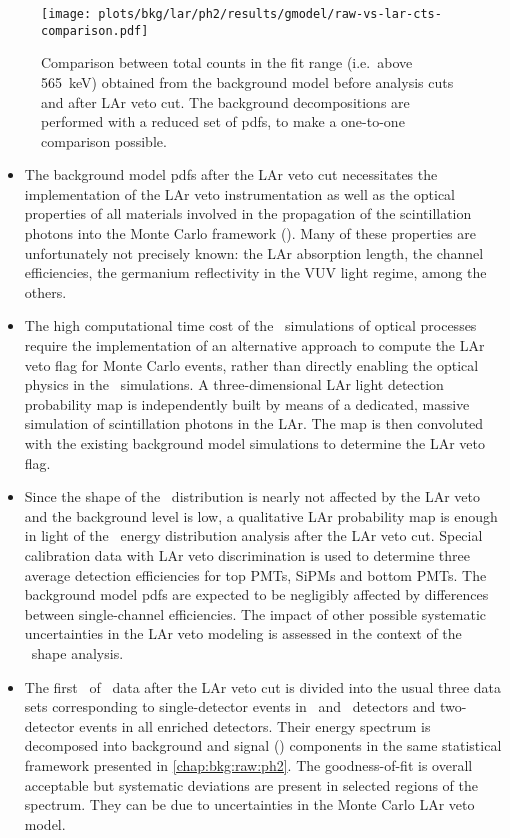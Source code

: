 \begin{figure}
  \centering
  \texttt{[image: plots/bkg/lar/ph2/results/gmodel/raw-vs-lar-cts-comparison.pdf]}
  \caption{%
    Comparison between total counts in the fit range (i.e.~above 565~keV) obtained from
    the background model before analysis cuts and after LAr veto cut. The background
    decompositions are performed with a reduced set of pdfs, to make a one-to-one
    comparison possible.
  }\label{fig:bkg:lar:ph2:cts-comparison}
\end{figure}

\chapsummary
\begin{itemize}
  \item The background model pdfs after the LAr veto cut necessitates the implementation
    of the LAr veto instrumentation as well as the optical properties of all materials
    involved in the propagation of the scintillation photons into the Monte Carlo
    framework (\mage). Many of these properties are unfortunately not precisely known: the
    LAr absorption length, the channel efficiencies, the germanium reflectivity in the VUV
    light regime, among the others.
  \item The high computational time cost of the \geant\ simulations of optical processes
    require the implementation of an alternative approach to compute the LAr veto flag for
    Monte Carlo events, rather than directly enabling the optical physics in the \mage\
    simulations. A three-dimensional LAr light detection probability map is independently
    built by means of a dedicated, massive simulation of scintillation photons in the LAr.
    The map is then convoluted with the existing background model simulations to determine
    the LAr veto flag.
  \item Since the shape of the \nnbb\ distribution is nearly not affected by the LAr veto
    and the background level is low, a qualitative LAr probability map is enough in light
    of the \nnbb\ energy distribution analysis after the LAr veto cut. Special calibration
    data with LAr veto discrimination is used to determine three average detection
    efficiencies for top PMTs, SiPMs and bottom PMTs. The background model pdfs are
    expected to be negligibly affected by differences between single-channel efficiencies.
    The impact of other possible systematic uncertainties in the LAr veto modeling is
    assessed in the context of the \nnbb\ shape analysis.
  \item The first \gexpophasetwobkg\ of \phasetwo\ data after the LAr veto cut is divided
    into the usual three data sets corresponding to single-detector events in \bege\ and
    \scoax\ detectors and two-detector events in all enriched detectors. Their energy
    spectrum is decomposed into background and signal (\nnbb) components in the same
    statistical framework presented in \cref{chap:bkg:raw:ph2}. The goodness-of-fit is
    overall acceptable but systematic deviations are present in selected regions of the
    spectrum. They can be due to uncertainties in the Monte Carlo LAr veto model.
\end{itemize}


